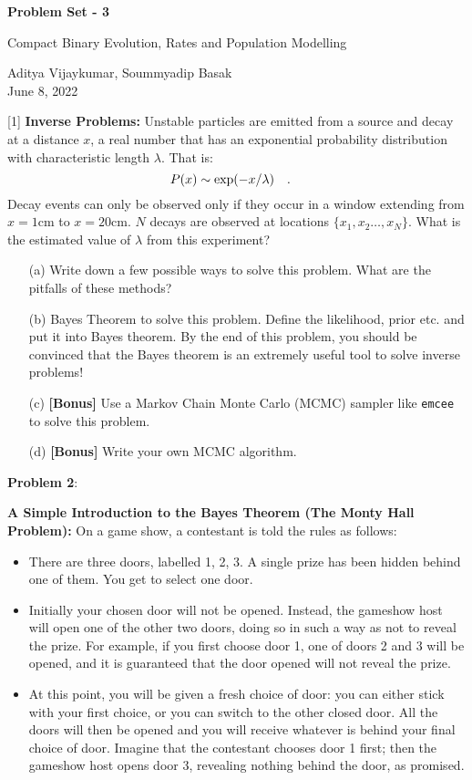 \documentclass{article} %
\newcommand{\question}[2][]{\begin{flushleft}
        \textbf{Problem #1}: %
\end{flushleft}
}
\newcommand{\maketitletwo}[2][]{\begin{center}
        \Large{\textbf{Problem Set - 3}
            
            Compact Binary Evolution, Rates and Population Modelling} %
        \vspace{10pt}
        
        \normalsize{Aditya Vijaykumar, Soummyadip Basak  %
        } \\
        \vspace{5pt}  June 8, 2022     %
        \vspace{15pt}
        
\end{center}}
\begin{document}
    \maketitletwo[5]  %
    
    \question[1]{} \textbf{Inverse Problems:} Unstable particles are emitted from a source and decay at a distance $x$, a real number that has an exponential probability distribution with characteristic length $\lambda$. That is:
    \begin{equation}
    	P(x) \sim \exp(- x / \lambda) \qq{.}
    \end{equation}
    Decay events can only be observed only if they occur in a window extending from $x = 1 \mathrm{cm}$ to $x = 20 \mathrm{ cm} $. $N$ decays are observed at locations $\{x_1, x_2 \ldots, x_N\}$. What is the estimated value of $ \lambda $ from this experiment?
    
    \begin{enumerate}
    \item[(a)] Write down a few possible ways to solve this problem. What are the pitfalls of these methods?
    \item[(b)]  Bayes Theorem to solve this problem. Define the likelihood, prior etc. and put it into Bayes theorem. By the end of this problem, you should be convinced that the Bayes theorem is an extremely useful tool to solve inverse problems!
    \item[(c)] \textbf{[Bonus]} Use a Markov Chain Monte Carlo (MCMC) sampler like \texttt{emcee} to solve this problem.
    \item[(d)]  \textbf{[Bonus]}  Write your own MCMC algorithm.
    \end{enumerate}

    \question[2]{}\textbf{A Simple Introduction to the Bayes Theorem (The Monty Hall Problem):} 
    On a game show, a contestant is told the rules as follows: 
    
    \begin{itemize}
    \item There are three doors, labelled 1, 2, 3. A single prize has been hidden behind one of them. You get to select one door. 
    \item Initially your chosen door will not be opened. Instead, the gameshow host will open one of the other two doors, doing so in such a way as not to reveal the prize. For example, if you first choose door 1, one of doors 2 and 3 will be opened, and it is guaranteed that the door opened will not reveal the prize. 
    \item At this point, you will be given a fresh choice of door: you can either stick with your first choice, or you can switch to the other closed door. All the doors will then be opened and you will receive whatever is behind your final choice of door. Imagine that the contestant chooses door 1 first; then the gameshow host opens door 3, revealing nothing behind the door, as promised. 
    \end{itemize}
    
\end{document}
